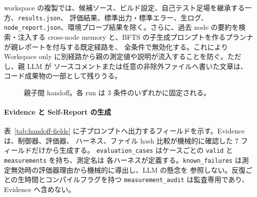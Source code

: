 \documentclass[conference,letterpaper]{IEEEtran}
\newcommand{\armW}{Workspace only}
\begin{document}
workspace の複製では、候補ソース、ビルド設定、自己テスト足場を継承する一方、\texttt{results.json}、
評価結果、標準出力・標準エラー、生ログ、\texttt{node\_report.json}、環境プローブ結果を除く。さらに、過去
node の要約を検索・注入する cross-node memory と、BFTS の子生成プロンプトを作るプランナが親レポートを付与する既定経路を、
全条件で無効化する。これにより \armW{} に別経路から親の測定値や説明が流入することを防ぐ。ただし、親 LLM が
ソースコメントまたは任意の非除外ファイルへ書いた文章は、コード成果物の一部として残りうる。

\begin{figure}[t]\centering
{}
\caption{親子間 handoff。各 run は 3 条件のいずれかに固定される。}
\label{fig:method}
\end{figure}

\paragraph{Evidence と Self-Report の生成}
表~\ref{tab:handoff-fields} に子プロンプトへ出力するフィールドを示す。Evidence は、制御器、評価器、
ハーネス、ファイル hash 比較が機械的に確認した 7 フィールドだけから生成する。
\texttt{evaluation\_cases} はケースごとの \texttt{valid} と \texttt{measurements} を持ち、測定名は
各ハーネスが定義する。\texttt{known\_failures} は測定無効時の評価器理由から機械的に導出し、LLM の懸念を
参照しない。反復ごとの生時間とコンパイルフラグを持つ \texttt{measurement\_audit} は監査専用であり、
Evidence へ含めない。
\end{document}
